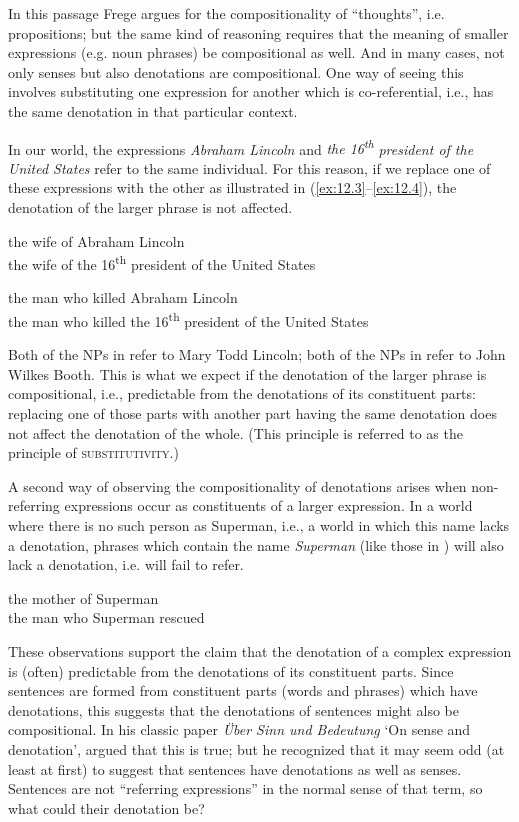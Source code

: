 In this passage Frege argues for the compositionality of “thoughts”, i.e. propositions; but the same kind of reasoning requires that the meaning of smaller expressions (e.g. noun phrases) be compositional as well. And in many cases, not only senses but also denotations are compositional. One way of seeing this involves substituting one expression for another which is co-referential, i.e., has the same denotation in that particular context.



In our world, the expressions \textit{Abraham Lincoln} and \textit{the 16\textsuperscript{th}} \textit{president of the United States} refer to the same individual. For this reason, if we replace one of these expressions with the other as illustrated in (\ref{ex:12.3}--\ref{ex:12.4}), the denotation of the larger phrase is not affected.


\ea \label{ex:12.3}
\ea the wife of Abraham Lincoln\\
\ex the wife of the 16\textsuperscript{th} president of the United States
                       \z
\z

\ea \label{ex:12.4}
\ea the man who killed Abraham Lincoln\\
\ex the man who killed the 16\textsuperscript{th} president of the United States
                       \z
\z


Both of the NPs in  refer to Mary Todd Lincoln; both of the NPs in  refer to John Wilkes Booth. This is what we expect if the denotation of the larger phrase is compositional, i.e., predictable from the denotations of its constituent parts: replacing one of those parts with another part having the same denotation does not affect the denotation of the whole. (This principle is referred to as the principle of \textsc{substitutivity}.)



A second way of observing the compositionality of denotations arises when non-referring expressions occur as constituents of a larger expression. In a world where there is no such person as Superman, i.e., a world in which this name lacks a denotation, phrases which contain the name \textit{Superman} (like those in ) will also lack a denotation, i.e. will fail to refer.


\ea \label{ex:12.5}
\ea the mother of Superman\\
\ex the man who Superman rescued
                       \z
\z


These observations support the claim that the denotation of a complex expression is (often) predictable from the denotations of its constituent parts. Since sentences are formed from constituent parts (words and phrases) which have denotations, this suggests that the denotations of sentences might also be compositional. In his classic paper \textit{Über Sinn und Bedeutung} ‘On sense and denotation’, \citet{Frege1892} argued that this is true; but he recognized that it may seem odd (at least at first) to suggest that sentences have denotations as well as senses. Sentences are not “referring expressions” in the normal sense of that term, so what could their denotation be?



